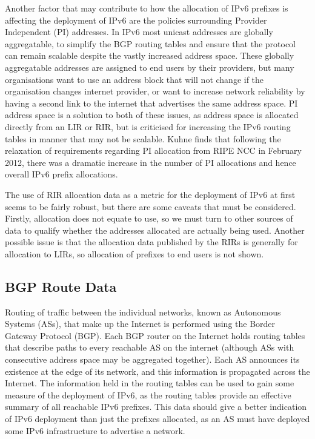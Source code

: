 Another factor that may contribute to how the allocation of IPv6 prefixes is
affecting the deployment of IPv6 are the policies surrounding Provider Independent
(PI) addresses. In IPv6 most unicast addresses are globally aggregatable, to simplify the BGP
routing tables and ensure that the protocol can remain scalable despite the
vastly increased address space. These globally aggregatable addresses are
assigned to end users by their providers, but many organisations want to use an
address block that will not change if the organisation changes internet
provider, or want to increase network reliability by having a second link to the
internet that advertises the same address space. PI address space is a solution
to both of these issues, as address space is allocated directly from an LIR or
RIR, but is criticised for increasing the IPv6 routing tables in manner that may
not be scalable\cite{karrenberg_pi_1995}. Kuhne finds that following the relaxation of requirements
regarding PI allocation from RIPE NCC in February 2012, there was a dramatic increase in the 
number of PI allocations and hence overall IPv6 prefix allocations\cite{mirjam_kuhne_update_2012}.

The use of RIR allocation data as a metric for the deployment of IPv6 at first
seems to be fairly robust, but there are some caveats that must be considered.
Firstly, allocation does not equate to use, so we must turn to other sources of
data to qualify whether the addresses allocated are actually being used. Another
possible issue is that the allocation data published by the RIRs is generally
for allocation to LIRs, so allocation of prefixes to end users is not shown.


\subsection{BGP Route Data}

Routing of traffic between the individual networks, known as Autonomous
Systems (ASs), that make up the Internet is performed using the Border Gateway
Protocol (BGP). Each BGP router on the Internet holds routing tables that
describe paths to every reachable AS on the internet (although ASs with
consecutive address space may be aggregated together).
Each AS announces its existence at the edge of its network, and this
information is propagated across the Internet.
The information held in the routing tables can be used to gain some measure of
the deployment of IPv6, as the routing tables provide an effective summary of
all reachable IPv6 prefixes. This data should give a better indication of IPv6
deployment than just the prefixes allocated\cite{karpilovsky_quantifying_2009}, as an AS must
have deployed some IPv6 infrastructure to advertise a network.

